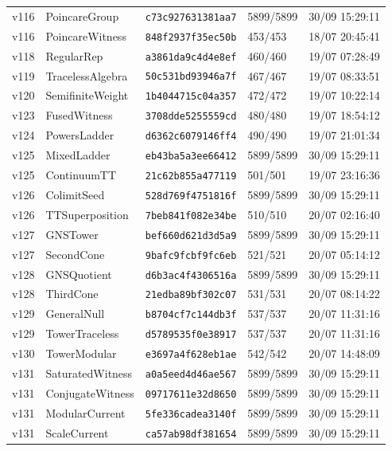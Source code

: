\documentclass[11pt]{article}
\theoremstyle{definition}\newtheorem{deriv}{Derivation}
\begin{document}
{\begin{longtable}{@{}lllll@{}}
v116 & PoincareGroup & \texttt{c73c927631381aa7} & 5899/5899 & 30/09 15:29:11 \\
v116 & PoincareWitness & \texttt{848f2937f35ec50b} & 453/453 & 18/07 20:45:41 \\
v118 & RegularRep & \texttt{a3861da9c4d4e8ef} & 460/460 & 19/07 07:28:49 \\
v119 & TracelessAlgebra & \texttt{50c531bd93946a7f} & 467/467 & 19/07 08:33:51 \\
v120 & SemifiniteWeight & \texttt{1b4044715c04a357} & 472/472 & 19/07 10:22:14 \\
v123 & FusedWitness & \texttt{3708dde5255559cd} & 480/480 & 19/07 18:54:12 \\
v124 & PowersLadder & \texttt{d6362c6079146ff4} & 490/490 & 19/07 21:01:34 \\
v125 & MixedLadder & \texttt{eb43ba5a3ee66412} & 5899/5899 & 30/09 15:29:11 \\
v125 & ContinuumTT & \texttt{21c62b855a477119} & 501/501 & 19/07 23:16:36 \\
v126 & ColimitSeed & \texttt{528d769f4751816f} & 5899/5899 & 30/09 15:29:11 \\
v126 & TTSuperposition & \texttt{7beb841f082e34be} & 510/510 & 20/07 02:16:40 \\
v127 & GNSTower & \texttt{bef660d621d3d5a9} & 5899/5899 & 30/09 15:29:11 \\
v127 & SecondCone & \texttt{9bafc9fcbf9fc6eb} & 521/521 & 20/07 05:14:12 \\
v128 & GNSQuotient & \texttt{d6b3ac4f4306516a} & 5899/5899 & 30/09 15:29:11 \\
v128 & ThirdCone & \texttt{21edba89bf302c07} & 531/531 & 20/07 08:14:22 \\
v129 & GeneralNull & \texttt{b8704cf7c144db3f} & 537/537 & 20/07 11:31:16 \\
v129 & TowerTraceless & \texttt{d5789535f0e38917} & 537/537 & 20/07 11:31:16 \\
v130 & TowerModular & \texttt{e3697a4f628eb1ae} & 542/542 & 20/07 14:48:09 \\
v131 & SaturatedWitness & \texttt{a0a5eed4d46ae567} & 5899/5899 & 30/09 15:29:11 \\
v131 & ConjugateWitness & \texttt{09717611e32d8650} & 5899/5899 & 30/09 15:29:11 \\
v131 & ModularCurrent & \texttt{5fe336cadea3140f} & 5899/5899 & 30/09 15:29:11 \\
v131 & ScaleCurrent & \texttt{ca57ab98df381654} & 5899/5899 & 30/09 15:29:11 \\

\end{longtable}}
\end{document}
